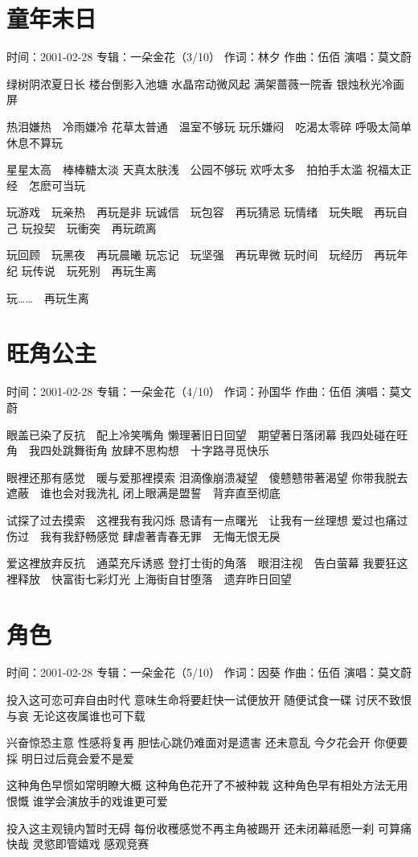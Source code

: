 \documentclass[UTF8,a4paper,oneside,twocolumn,12pt]{ctexbook}
\newcommand{\infopair}[2]{\textbullet #1：#2}
\newcommand{\zc}[1][伍佰]{\infopair{作词}{#1}}
\newcommand{\zq}[1][伍佰]{\infopair{作曲}{#1}}
\newcommand{\zj}[1]{\infopair{专辑}{#1}}
\newcommand{\sj}[1]{\infopair{时间}{#1}}
\newenvironment{info}{\begin{flushleft}\kaishu
	}
	{\end{flushleft}\normalsize\yahei\par}
\newenvironment{lyric}{
	}
{}
\begin{document}
\section{童年末日}
\begin{info}
	\sj{2001-02-28}
	\zj{一朵金花（3/10）}
	\zc[林夕]
	\zq
	\infopair{演唱}{莫文蔚}
\end{info}
\begin{lyric}
	绿树阴浓夏日长
	楼台倒影入池塘
	水晶帘动微风起
	满架蔷薇一院香
	银烛秋光冷画屏
	
	热泪嫌热　冷雨嫌冷
	花草太普通　温室不够玩
	玩乐嫌闷　吃渴太零碎
	呼吸太简单　休息不算玩

	星星太高　棒棒糖太淡
	天真太肤浅　公园不够玩
	欢呼太多　拍拍手太滥
	祝福太正经　怎麽可当玩

	玩游戏　玩亲热　再玩是非
	玩诚信　玩包容　再玩猜忌
	玩情绪　玩失眠　再玩自己
	玩投契　玩衝突　再玩疏离

	玩回顾　玩黑夜　再玩晨曦
	玩忘记　玩坚强　再玩卑微
	玩时间　玩经历　再玩年纪
	玩传说　玩死别　再玩生离

	玩……　再玩生离
\end{lyric}

\section{旺角公主}
\begin{info}
	\sj{2001-02-28}
	\zj{一朵金花（4/10）}
	\zc[孙国华]
	\zq
	\infopair{演唱}{莫文蔚}
\end{info}
\begin{lyric}
	眼盖已染了反抗　配上冷笑嘴角
	懒理著旧日回望　期望著日落闭幕
	我四处碰在旺角　我四处跳舞街角
	放肆不思构想　十字路寻觅快乐

	眼裡还那有感觉　暖与爱那裡摸索
	泪滴像崩溃凝望　傻戆戆带著渴望
	你带我脱去遮蔽　谁也会对我洗礼
	闭上眼满是盟誓　背弃直至彻底

	试探了过去摸索　这裡我有我闪烁
	恳请有一点曙光　让我有一丝理想
	爱过也痛过伤过　我有我舒畅感觉
	肆虐著青春无罪　无悔无恨无戾

	爱这裡放弃反抗　通菜充斥诱惑
	登打士街的角落　眼泪注视　告白萤幕
	我要狂这裡释放　快富街七彩灯光
	上海街自甘堕落　遗弃昨日回望
\end{lyric}

\section{角色}
\begin{info}
	\sj{2001-02-28}
	\zj{一朵金花（5/10）}
	\zc[因葵]
	\zq
	\infopair{演唱}{莫文蔚}
\end{info}
\begin{lyric}
	投入这可恋可弃自由时代
	意味生命将要赶快一试便放开
	随便试食一碟 讨厌不致恨与哀
	无论这夜属谁也可下载

	兴奋惊恐主意 性感将复再
	胆怯心跳仍难面对是遗害
	还未意乱 今夕花会开 你便要採
	明日过后竟会爱不是爱

	这种角色早惯如常明瞭大概
	这种角色花开了不被种栽
	这种角色早有相处方法无用恨慨
	谁学会演放手的戏谁更可爱

	投入这主观镜内暂时无碍
	每份收穫感觉不再主角被踢开
	还未闭幕祗愿一刹 可算痛快哉
	灵慾即管嬉戏 感观竞赛
\end{lyric}
\end{document}
